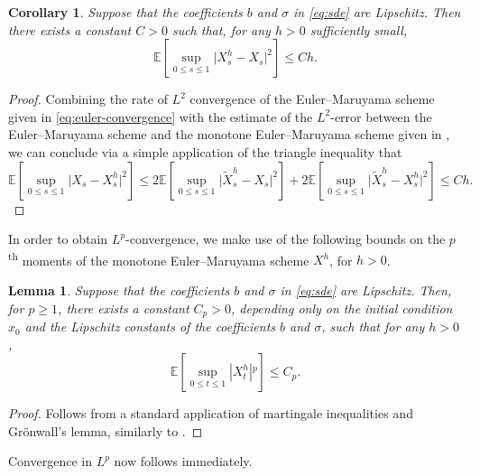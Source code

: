\documentclass[oneside]{amsart}
\newtheorem{lemma}[theorem]{Lemma}
\newtheorem{corollary}[theorem]{Corollary}
\theoremstyle{definition}
\def\E{{\mathbb E}}
\numberwithin{equation}{section}
\begin{document}
\begin{corollary}\label{cor:l2-convergence}
	Suppose that the coefficients $b$ and $\sigma$ in \eqref{eq:sde} are Lipschitz. Then there exists a constant $C > 0$ such that, for any $h > 0$ sufficiently small,
	\begin{equation}
		\E \!\left[ \sup_{0 \leq s \leq 1} \lvert X^h_s - X_s \rvert^2 \right] \leq C h.
	\end{equation}
\end{corollary}
\begin{proof}
	Combining the rate of $L^2$ convergence of the Euler--Maruyama scheme given in \eqref{eq:euler-convergence} with the estimate of the $L^2$-error between the Euler--Maruyama scheme and the monotone Euler--Maruyama scheme given in , we can conclude via a simple application of the triangle inequality that
	\begin{equation}
		\E \!\left[\sup_{0 \leq s \leq 1} \lvert X_s - X^h_s\rvert^2\right] \leq 2 \E \!\left[ \sup_{0 \leq s \leq 1} \lvert \tilde{X}^h_s - X_s \rvert^2 \right] + 2 \E \!\left[\sup_{0 \leq s \leq 1} \lvert \tilde{X}^h_s - X^h_s\rvert^2\right] \leq C h.
	\end{equation}
\end{proof}

In order to obtain $L^p$-convergence, we make use of the following bounds on the $p$\textsuperscript{th} moments of the monotone Euler--Maruyama scheme $X^h$, for $h > 0$.

\begin{lemma}\label{lem:truncated-scheme-l2-bound}
	Suppose that the coefficients $b$ and $\sigma$ in \eqref{eq:sde} are Lipschitz. Then, for $p\ge 1$, there exists a constant $C_p > 0$, depending only on the initial condition $x_0$ and the Lipschitz constants of the coefficients $b$ and $\sigma$, such that for any $h>0$,
	\begin{equation}
		\E \!\left[\sup_{0 \leq t \leq 1}\!\left\lvert X^h_t \right\rvert\!^p\right] \leq C_p.
	\end{equation}
\end{lemma}

\begin{proof}
	Follows from a standard application of martingale inequalities and Gr\"onwall's lemma, similarly to .
\end{proof}

Convergence in $L^p$ now follows immediately.
\end{document}
